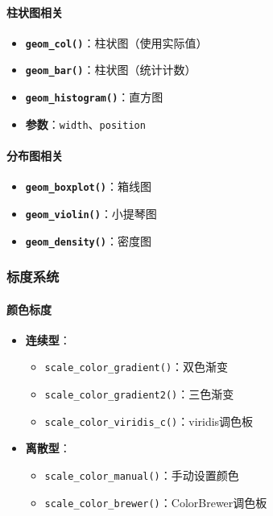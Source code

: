 \documentclass[
]{book}
\providecommand{\tightlist}{%
  \setlength{\itemsep}{0pt}\setlength{\parskip}{0pt}}
\begin{document}
\hypertarget{ux67f1ux72b6ux56feux76f8ux5173}{%
\paragraph{柱状图相关}\label{ux67f1ux72b6ux56feux76f8ux5173}}

\begin{itemize}
\tightlist
\item
  \textbf{\texttt{geom\_col()}}：柱状图（使用实际值）
\item
  \textbf{\texttt{geom\_bar()}}：柱状图（统计计数）
\item
  \textbf{\texttt{geom\_histogram()}}：直方图
\item
  \textbf{参数}：\texttt{width}、\texttt{position}
\end{itemize}

\hypertarget{ux5206ux5e03ux56feux76f8ux5173}{%
\paragraph{分布图相关}\label{ux5206ux5e03ux56feux76f8ux5173}}

\begin{itemize}
\tightlist
\item
  \textbf{\texttt{geom\_boxplot()}}：箱线图
\item
  \textbf{\texttt{geom\_violin()}}：小提琴图
\item
  \textbf{\texttt{geom\_density()}}：密度图
\end{itemize}

\hypertarget{ux6807ux5ea6ux7cfbux7edf}{%
\subsubsection{标度系统}\label{ux6807ux5ea6ux7cfbux7edf}}

\hypertarget{ux989cux8272ux6807ux5ea6}{%
\paragraph{颜色标度}\label{ux989cux8272ux6807ux5ea6}}

\begin{itemize}
\tightlist
\item
  \textbf{连续型}：

  \begin{itemize}
  \tightlist
  \item
    \texttt{scale\_color\_gradient()}：双色渐变
  \item
    \texttt{scale\_color\_gradient2()}：三色渐变
  \item
    \texttt{scale\_color\_viridis\_c()}：viridis调色板
  \end{itemize}
\item
  \textbf{离散型}：

  \begin{itemize}
  \tightlist
  \item
    \texttt{scale\_color\_manual()}：手动设置颜色
  \item
    \texttt{scale\_color\_brewer()}：ColorBrewer调色板
  \end{itemize}
\end{itemize}
\end{document}
